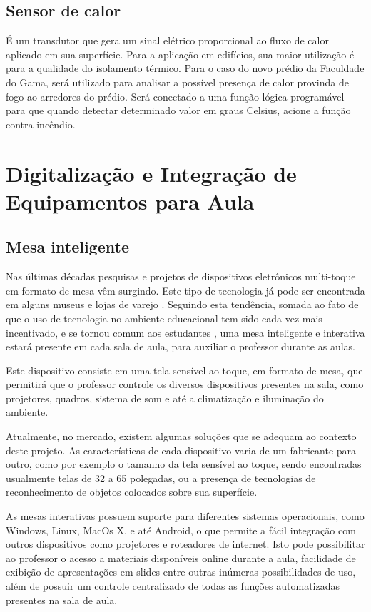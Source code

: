 \subsection{Sensor de calor}
É um transdutor que gera um sinal elétrico proporcional ao fluxo de calor aplicado em sua superfície. Para a aplicação em edifícios, sua maior utilização é para a qualidade do isolamento térmico. Para o caso do novo prédio da Faculdade do Gama, será utilizado para analisar a possível presença de calor provinda de fogo ao arredores do prédio. Será conectado a uma função lógica programável para que quando detectar determinado valor em graus Celsius, acione a função contra incêndio.

\section{Digitalização e Integração de Equipamentos para Aula}
\subsection{Mesa inteligente}
Nas últimas décadas pesquisas e projetos de dispositivos eletrônicos multi-toque em formato de mesa vêm surgindo. Este tipo de tecnologia já pode ser encontrada em alguns museus e lojas de varejo \cite{horn2008}. Seguindo esta tendência, somada ao fato de que o uso de tecnologia no ambiente educacional tem sido cada vez mais incentivado, e se tornou comum aos estudantes \cite{bulman2015}, uma mesa inteligente e interativa estará presente em cada sala de aula, para auxiliar o professor durante as aulas.

Este dispositivo consiste em uma tela sensível ao toque, em formato de mesa, que permitirá que o professor controle os diversos dispositivos presentes na sala, como projetores, quadros, sistema de som e até a climatização e iluminação do ambiente.

Atualmente, no mercado, existem algumas soluções que se adequam ao contexto deste projeto. As características de cada dispositivo varia de um fabricante para outro, como por exemplo o tamanho da tela sensível ao toque, sendo encontradas usualmente telas de 32 a 65 polegadas, ou a presença de tecnologias de reconhecimento de objetos colocados sobre sua superfície.

As mesas interativas possuem suporte para diferentes sistemas operacionais, como Windows, Linux, MacOs X, e até Android, o que permite a fácil integração com outros dispositivos como projetores e roteadores de internet. Isto pode possibilitar ao professor o acesso a materiais disponíveis online durante a aula, facilidade de exibição de apresentações em slides entre outras inúmeras possibilidades de uso, além de possuir um controle centralizado de todas as funções automatizadas presentes na sala de aula.

